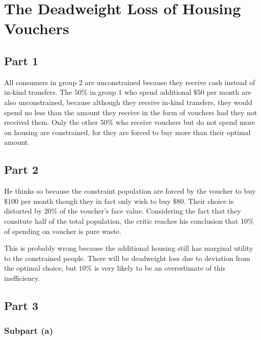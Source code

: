 \documentclass{article}
\begin{document}
\section{The Deadweight Loss of Housing Vouchers}
\subsection{Part 1}
All consumers in group 2 are unconstrained because they receive cash instead of in-kind transfers. The $50\%$ in group 1 who spend additional $\$50$ per month are also unconstrained, because although they receive in-kind transfers, they would spend no less than the amount they receive in the form of vouchers had they not received them. Only the other $50\%$ who receive vouchers but do not spend more on housing are constrained, for they are forced to buy more than their optimal amount.

\subsection{Part 2}
He thinks so because the constraint population are forced by the voucher to buy $\$100$ per month though they in fact only wish to buy $\$80$. Their choice is distorted by $20\%$ of the voucher's face value. Considering the fact that they consitute half of the total population, the critic reaches his conclusion that $10\%$ of spending on voucher is pure waste.

This is probably wrong because the additional housing still has marginal utility to the constrained people. There will be deadweight loss due to deviation from the optimal choice, but $10\%$ is very likely to be an overestimate of this inefficiency.

\subsection{Part 3}
\subsubsection{Subpart (a)}
\end{document}
